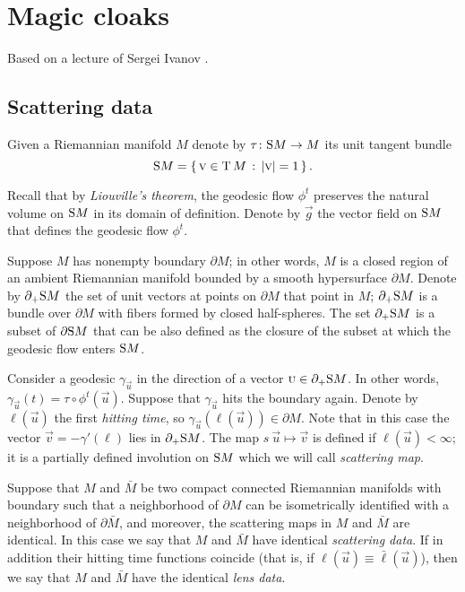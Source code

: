 \chapter{Magic cloaks}

Based on a lecture of Sergei Ivanov \cite{ivanov-2012}.

\section{Scattering data}

Given a Riemannian manifold $M$ denote by $\tau\:\S M\to M$ its unit tangent bundle
\[\S M=\set{\vec v\in \T M}{|\vec v|=1}.\]

Recall that by \emph{Liouville's theorem}, the geodesic flow $\phi^t$ preserves the natural volume on $\S M$ in its domain of definition.
Denote by $\vec g$ the vector field on $\S M$ that defines the geodesic flow $\phi^t$.

Suppose $M$ has nonempty boundary $\partial M$;
in other words, $M$ is a closed region of an ambient Riemannian  manifold bounded by a smooth hypersurface $\partial M$.
Denote by $\partial_+\S  M$ the set of unit vectors at points on $\partial M$ that point in $M$;
$\partial_+\S  M$ is a bundle over $\partial M$ with fibers formed by closed half-spheres.
The set $\partial_+ \S M$ is a subset of $\partial \S M$ that can be also defined as the closure of the subset at which the geodesic flow enters $\S M$.


Consider a geodesic $\gamma_{\vec u}$ in the direction of a vector $\vec u\in \partial_+\S  M$.
In other words, $\gamma_{\vec u}(t)=\tau\circ \phi^t(\vec u)$.
Suppose that $\gamma_{\vec u}$ hits the boundary again.
Denote by $\ell(\vec u)$ the first \emph{hitting time}, so $\gamma_{\vec u}(\ell(\vec u))\in \partial M$.
Note that in this case the vector $\vec v=-\gamma'(\ell)$ lies in $\partial_+\S  M$.
The map $s\:\vec u\mapsto \vec v$ is defined if $\ell(\vec u)<\infty$;
it is a partially defined involution on $\S M$ which we will call \emph{scattering map}.

Suppose that $M$ and $\bar M$ be two compact connected Riemannian manifolds with boundary such that a neighborhood of $\partial M$ can be isometrically identified with a neighborhood of $\partial \bar M$,
and moreover, the scattering maps in $M$ and $\bar M$ are identical.
In this case we say that $M$ and $\bar M$ have identical  \emph{scattering data}.
If in addition their hitting time functions  coincide (that is, if $\ell(\vec u)\equiv\bar\ell(\vec u)$), then we say that $M$ and $\bar M$ have the identical \emph{lens data}.

